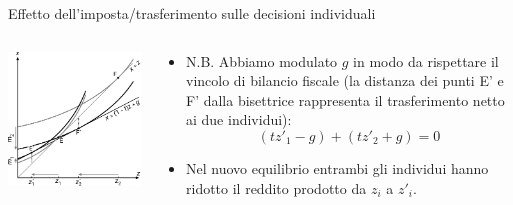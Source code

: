 \documentclass[aspectratio=64,11pt]{beamer}
\begin{document}
\begin{frame}{Effetto dell'imposta/trasferimento sulle decisioni individuali}
\begin{columns}
\begin{column}{.55\columnwidth}
\begin{center}
\includegraphics[width=\textwidth]{./figure/effetto-distorsivo-imposte-ql-3.pdf}
\end{center}
\end{column}


\begin{column}{.45\columnwidth}
\begin{itemize}
\item N.B. Abbiamo modulato $g$ in modo da rispettare il vincolo di bilancio
fiscale (la distanza dei punti E' e F' dalla bisettrice rappresenta il
trasferimento netto ai due individui):
$$ (tz'_1-g)+(tz'_2+g)=0 $$
\item Nel nuovo equilibrio entrambi gli individui hanno ridotto il reddito
prodotto da $z_i$ a $z'_i$.
\end{itemize}
\end{column}
\end{columns}
\end{frame}
\end{document}
